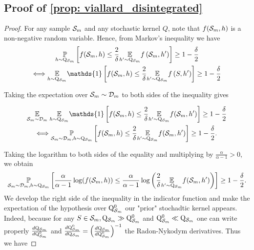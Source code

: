\subsection{Proof of \cref{prop: viallard_disintegrated} }


\begin{proof}
 For any sample $\mathcal{S}_m$ and any stochastic kernel $Q$, note that $f(\mathcal{S}_m,h)$ is a non-negative random variable. Hence, from Markov's inequality we have
\begin{multline*}
    \underset{h \sim \Q_{\Sm}}{\mathbb{P}}\left[f(\Sm,h) \leq \frac{2}{\delta} \underset{h^{\prime} \sim \Q_{\Sm}}{\mathbb{E}} f\left( \Sm,h^{\prime}\right)\right] \geq 1-\frac{\delta}{2} \\
    \Longleftrightarrow
    \underset{h \sim \Q_{\Sm}}{\mathbb{E}} \mathds{1}\left[f(\Sm,h) \leq \frac{2}{\delta} \underset{h^{\prime} \sim \Q_{\Sm}}{\mathbb{E}} f\left(S,h'\right)\right] \geq 1-\frac{\delta}{2}
\end{multline*}


Taking the expectation over $\mathcal{S}_m \sim \mathcal{D}_{m}$ to both sides of the inequality gives

\begin{multline*}
\underset{\Sm \sim \Dm}{\mathbb{E}}\; \underset{h \sim \Q_{\Sm}}{\mathbb{E}} \mathds{1}\left[f(\Sm,h) \leq \frac{2}{\delta} \underset{h^{\prime} \sim \Q_{\Sm}}{\mathbb{E}} f(\Sm,h')\right] \geq 1-\frac{\delta}{2} \\
\Longleftrightarrow
\underset{\Sm \sim \Dm, h \sim \Q_{\Sm}}{\mathbb{P}}\left[f(\Sm,h) \leq \frac{2}{\delta} \underset{h^{\prime} \sim \Q_{\Sm}}{\mathbb{E}} f(\Sm,h')\right] \geq 1-\frac{\delta}{2}.
\end{multline*}

Taking the logarithm to both sides of the equality and multiplying by $\frac{\alpha}{\alpha-1}>0$, we obtain
$$
\underset{\mathcal{S}_m \sim \mathcal{D}_{m}, h \sim \mathrm{Q}_{\mathcal{S}_m}}{\mathbb{P}}\left[\frac{\alpha}{\alpha-1} \log (f(\mathcal{S}_m,h)) \leq \frac{\alpha}{\alpha-1} \log \left(\frac{2}{\delta} \underset{h^{\prime} \sim \mathrm{Q}_{\mathcal{S}_m}}{\mathbb{E}} f(\mathcal{S}_m,h')\right)\right] \geq 1-\frac{\delta}{2} .
$$
We develop the right side of the inequality in the indicator function and make the expectation of the hypothesis over $\mathrm{Q}_{\mathcal{S}_m}^0$ our "prior" stochadtic kernel appears. Indeed, because for any $S\in\mathcal{S}_m, \mathrm{Q}_{\mathcal{S}_m}\gg\mathrm{Q}_{\mathcal{S}_m}^0$ and $\mathrm{Q}_{\mathcal{S}_m}^0\ll \mathrm{Q}_{\mathcal{S}_m}$ one can write properly $\frac{d\mathrm{Q}_{\mathcal{S}_m}}{d\mathrm{Q}_{\mathcal{S}_m}^0}$ and $ \frac{d\mathrm{Q}_{\mathcal{S}_m}^0}{d\mathrm{Q}_{\mathcal{S}_m}} = \left( \frac{d\mathrm{Q}_{\mathcal{S}_m}}{d\mathrm{Q}_{\mathcal{S}_m}^0}\right)^{-1}$ the Radon-Nykodym derivatives. Thus we have


\end{proof}
